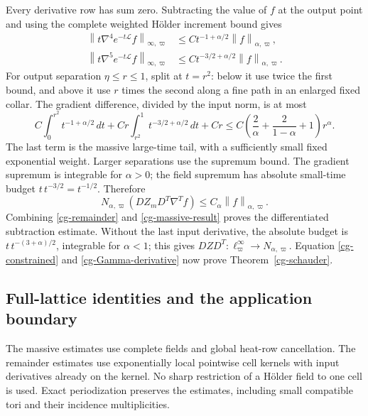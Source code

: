 \documentclass[11pt]{article}
\theoremstyle{remark}
\newcommand{\norm}[1]{\left\|#1\right\|}
\begin{document}
Every derivative row has sum zero. Subtracting the value of $f$
at the output point and using the complete weighted H\"older
increment bound gives
\begin{align}
 \norm{t\nabla^4e^{-t\mathcal L}f}_{\infty,\varpi}
   &\le Ct^{-1+\alpha/2}\norm{f}_{\alpha,\varpi},\nonumber\\
 \norm{t\nabla^5e^{-t\mathcal L}f}_{\infty,\varpi}
   &\le Ct^{-3/2+\alpha/2}\norm{f}_{\alpha,\varpi}.
                                                        \label{cg-cancellation}
\end{align}
For output separation $\eta\le r\le1$, split at $t=r^2$:
below it use twice the first bound, and above it use $r$ times
the second along a fine path in an enlarged fixed collar.
The gradient difference, divided by the input norm, is at most
\begin{equation}\label{cg-schauder-split}
 C\int_0^{r^2}t^{-1+\alpha/2}\,dt
 +Cr\int_{r^2}^1t^{-3/2+\alpha/2}\,dt+Cr
 \le C\left(\frac2\alpha+\frac2{1-\alpha}+1\right)r^\alpha.
\end{equation}
The last term is the massive large-time tail, with a sufficiently
small fixed exponential weight. Larger separations use the
supremum bound. The gradient supremum is integrable for
$\alpha>0$; the field supremum has absolute small-time budget
$t\,t^{-3/2}=t^{-1/2}$. Therefore
\begin{equation}\label{cg-massive-result}
 N_{\alpha,\varpi}(DZ_mD^T\nabla^Tf)
       \le C_\alpha\norm{f}_{\alpha,\varpi}.
\end{equation}
Combining \eqref{cg-remainder} and \eqref{cg-massive-result}
proves the differentiated subtraction estimate. Without the
last input derivative, the absolute budget is
$t\,t^{-(3+\alpha)/2}$, integrable for $\alpha<1$; this gives
$DZD^T:\ell^\infty_\varpi\to N_{\alpha,\varpi}$.
Equation \eqref{cg-constrained} and
\eqref{cg-Gamma-derivative} now prove
Theorem~\ref{cg-schauder}.

\subsection{Full-lattice identities and the application boundary}

The massive estimates use complete fields and global heat-row
cancellation. The remainder estimates use exponentially local
pointwise cell kernels with input derivatives already on the
kernel. No sharp restriction of a H\"older field to one cell is
used. Exact periodization preserves the estimates, including
small compatible tori and their incidence multiplicities.
\end{document}
